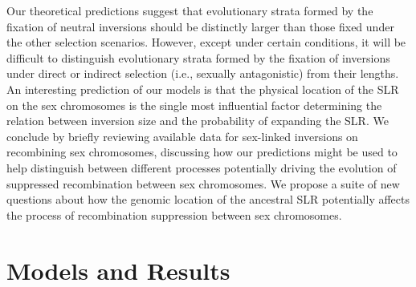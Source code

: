 \documentclass{article}[12pt]
\begin{document}
Our theoretical predictions suggest that evolutionary strata formed by the fixation of neutral inversions should be distinctly larger than those fixed under the other selection scenarios. However, except under certain conditions, it will be difficult to distinguish evolutionary strata formed by the fixation of inversions under direct or indirect selection (i.e., sexually antagonistic) from their lengths. An interesting prediction of our models is that the physical location of the SLR on the sex chromosomes is the single most influential factor determining the relation between inversion size and the probability of expanding the SLR. We conclude by briefly reviewing available data for sex-linked inversions on recombining sex chromosomes, discussing how our predictions might be used to help distinguish between different processes potentially driving the evolution of suppressed recombination between sex chromosomes. We propose a suite of new questions about how the genomic location of the ancestral SLR potentially affects the process of recombination suppression between sex chromosomes.



\section*{Models and Results} \label{sec:Models}

\end{document}

